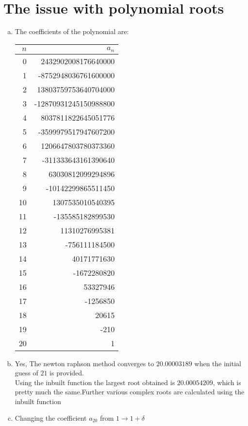 \section{The issue with polynomial roots}
\begin{enumerate}[(a)]
	\item The coefficients of the polynomial are:
		\begin{table}[H]
			\centering
			\begin{tabular}{r|r}
			$n$ & $a_n$\\
			\hline
			0	&	2432902008176640000 \\		
			1	&	-8752948036761600000 \\
			2	&	13803759753640704000 \\
			3	&	-12870931245150988800 \\
			4	&	8037811822645051776 \\
			5	&	-3599979517947607200 \\
			6	&	1206647803780373360\\
			7	&	-311333643161390640\\
			8	&	63030812099294896\\
			9	&	-10142299865511450\\
			10	&	1307535010540395\\
			11	&	-135585182899530\\
			12	&	11310276995381\\
			13	&	-756111184500\\
			14	&	40171771630\\
			15	&	-1672280820\\
			16	&	53327946\\
			17	&	-1256850\\
			18	&	20615\\
			19	&	-210\\
			20	&	1
			\end{tabular}
		\end{table}
	\item Yes, The newton raphson method converges to $20.00003189$ when the initial guess of $21$ is provided.\\
			Using the inbuilt function the largest root obtained is $20.00054209$, which is pretty much the same.Further various complex roots are calculated using the inbuilt function
	\item Changing the coefficient $a_{20}$ from $1 \rightarrow 1+\delta$
		\begin{table}[H]
			\centering
			\begin{tabular}{c|c|c}

\end{tabular}
\end{table}
\end{enumerate}
